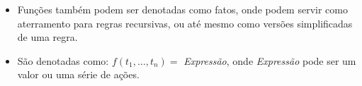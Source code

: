 \begin{frame}[fragile, c, allowframebreaks=0.75]
    \framebreak
    
    \begin{itemize}
    
        \item Funções também podem ser denotadas como fatos, onde podem servir como 
        aterramento para regras recursivas, ou até mesmo como versões simplificadas de uma 
        regra. 
        
        \item São denotadas como: $f(t_1,\ldots,t_n) = $ \emph{Expressão}, onde \textit{Expressão}
        pode ser um valor ou uma série de ações.
        
    \end{itemize}
    
\end{frame}


